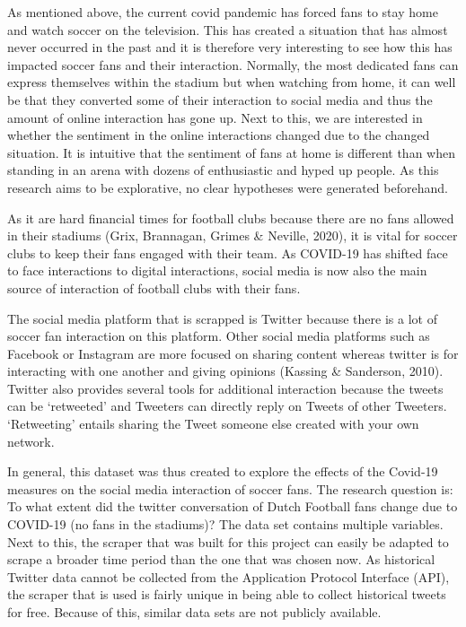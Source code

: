 \documentclass[12pt]{article}
\begin{document}
As mentioned above, the current covid pandemic has forced fans to stay home and watch soccer on the television. This has created a situation that has almost never occurred in the past and it is therefore very interesting to see how this has impacted soccer fans and their interaction. Normally, the most dedicated fans can express themselves within the stadium but when watching from home, it can well be that they converted some of their interaction to social media and thus the amount of online interaction has gone up. Next to this, we are interested in whether the sentiment in the online interactions changed due to the changed situation. It is intuitive that the sentiment of fans at home is different than when standing in an arena with dozens of enthusiastic and hyped up people. As this research aims to be explorative, no clear hypotheses were generated beforehand.

As it are hard financial times for football clubs because there are no fans allowed in their stadiums (Grix, Brannagan, Grimes \& Neville, 2020), it is vital for soccer clubs to keep their fans engaged with their team. As COVID-19 has shifted face to face interactions to digital interactions, social media is now also the main source of interaction of football clubs with their fans.

The social media platform that is scrapped is Twitter because there is a lot of soccer fan interaction on this platform. Other social media platforms such as Facebook or Instagram are more focused on sharing content whereas twitter is for interacting with one another and giving opinions (Kassing \& Sanderson, 2010). Twitter also provides several tools for additional interaction because the tweets can be ‘retweeted’ and Tweeters can directly reply on Tweets of other Tweeters. ‘Retweeting’ entails sharing the Tweet someone else created with your own network.

In general, this dataset was thus created to explore the effects of the Covid-19 measures on the social media interaction of soccer fans. The research question is: To what extent did the twitter conversation of Dutch Football fans change due to COVID-19 (no fans in the stadiums)? The data set contains multiple variables. Next to this, the scraper that was built for this project can easily be adapted to scrape a broader time period than the one that was chosen now. As historical Twitter data cannot be collected from the Application Protocol Interface (API), the scraper that is used is fairly unique in being able to collect historical tweets for free. Because of this, similar data sets are not publicly available.
\end{document}
